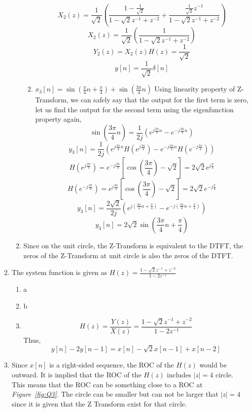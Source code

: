 \documentclass[a4paper,12pt]{article}
\begin{document}
\begin{enumerate}
\begin{enumerate}
\begin{enumerate}
 						$$ X_2(z)= \frac{1}{\sqrt{2}} \left( \frac{1-\frac{1}{\sqrt{2}}}{1-\sqrt{2}z^{-1}+z^{-2}}+ \frac{\frac{1}{\sqrt{2}}z^{-1}}{1-\sqrt{2} z^{-1}+z^{-2}}\right)$$
	 						$$ X_2(z)=\frac{1}{\sqrt{2}} \left( \frac{1}{1-\sqrt{2}z^{-1}+z^{-2}} \right) $$
	 						$$ Y_2(z)= X_2(z)H(z)=\frac{1}{\sqrt{2}}$$
	 						$$\boxed{ y[n]=\frac{1}{\sqrt{2}} \delta [n] }$$
	 					\item $x_3[n]=\sin(\frac{\pi}{4}n+\frac{\pi}{4})+\sin(\frac{3\pi}{4}n)$
	 					Using linearity property of Z-Transform, we can safely say that the output for the first term is zero, let us find the output for the second term using the eigenfunction property again,
	 					$$	\sin(\frac{3\pi}{4}n)=\frac{1}{2j} \left(e^{j\frac{3\pi}{4}n}-e^{-j\frac{3\pi}{4}n}\right)$$
	 					$$ y_3[n]=\frac{1}{2j} \left(e^{j\frac{3\pi}{4}n}H(e^{j\frac{3\pi}{4}})-e^{-j\frac{3\pi}{4}n}H(e^{-j\frac{3\pi}{4}})\right) $$
	 					$$H(e^{j\frac{3\pi}{4}})=e^{-j\frac{3\pi}{4}}\left[\cos(\frac{3\pi}{4})-\sqrt{2}\right]=2\sqrt{2}e^{j\frac{\pi}{4}}$$
	 					$$H(e^{-j\frac{3\pi}{4}})=e^{j\frac{3\pi}{4}}\left[\cos(\frac{3\pi}{4})-\sqrt{2}\right]=2\sqrt{2}e^{-j\frac{\pi}{4}}$$
	 					$$ y_3[n]=\frac{2\sqrt{2}}{2j} \left(e^{j(\frac{3\pi}{4}n+\frac{\pi}{4})}-e^{-j(\frac{3\pi}{4}n+\frac{\pi}{4})}\right) $$
	 					$$\boxed{ y_3[n]=2\sqrt{2} \sin(\frac{3\pi}{4}n+\frac{\pi}{4})} $$
	 						 
 				\end{enumerate}
			\item Since on the unit circle, the Z-Transform is equivalent to the DTFT, the zeros of the Z-Transform at unit circle is also the zeros of the DTFT.
		\end{enumerate}
		 
		
			
	\item The system function is given as $H(z)=\frac{1-\sqrt{2}z^{-1}+z^{-2}}{1-2z^{-1}}$
		
		\begin{enumerate}
			\item a
			\item b
			\item 
				$$ H(z)=\frac{Y(z)}{X(z)}=\frac{1-\sqrt{2}z^{-1}+z^{-2}}{1-2z^{-1}}$$
				Thus,
				$$\boxed{ y[n]-2y[n-1]=x[n]-\sqrt{2}x[n-1]+x[n-2] }$$
		\end{enumerate}
				
	\item Since $x[n]$ is a right-sided sequence, the ROC of the  $H(z)$ would be outward. It is implied that the ROC of the $H(z) $ includes $|z|=4$ circle. This means that the ROC can be something close to a ROC at \textit{Figure~\ref{fig:Q3}}. The circle can be smaller but can not be larger that $|z|=4$ since it is given that the Z Transform exist for that circle. 
	

\end{enumerate}
\end{document}
